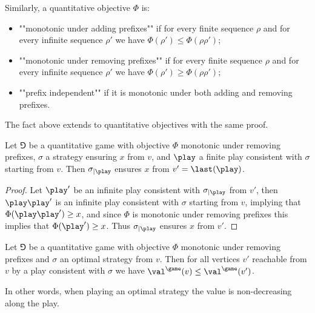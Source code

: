 Similarly, a quantitative objective $\Phi$ is:
\begin{itemize}
	\item ""monotonic under adding prefixes"" if for every finite sequence $\rho$ and for every infinite sequence $\rho'$
	we have $\Phi(\rho') \le \Phi(\rho \rho')$;
	\item ""monotonic under removing prefixes"" if for every finite sequence $\rho$ and for every infinite sequence $\rho'$
	we have $\Phi(\rho') \ge \Phi(\rho \rho')$;
	\item ""prefix independent"" if it is monotonic under both adding and removing prefixes.
\end{itemize}
The fact above extends to quantitative objectives with the same proof.
\begin{fact}
\label{1-fact:winning_prefix_independent_quantitative}
Let $\Game$ be a quantitative game with objective $\Phi$ monotonic under removing prefixes,
$\sigma$ a strategy ensuring $x$ from $v$, and $\play$ a finite play consistent with $\sigma$ starting from $v$.
Then $\sigma_{\mid \play}$ ensures $x$ from $v' = \last(\play)$.
\end{fact}
\begin{proof}
Let $\play'$ be an infinite play consistent with $\sigma_{\mid \play}$ from $v'$,
then $\play \play'$ is an infinite play consistent with $\sigma$ starting from $v$, 
implying that $\Phi(\play \play') \ge x$, and since $\Phi$ is monotonic under removing prefixes
this implies that $\Phi(\play') \ge x$. Thus $\sigma_{\mid \play}$ ensures $x$ from $v'$.
\end{proof}

\begin{corollary}
\label{1-cor:comparison_values_along_play}
Let $\Game$ be a quantitative game with objective $\Phi$ monotonic under removing prefixes and $\sigma$ an optimal strategy from $v$.
Then for all vertices $v'$ reachable from $v$ by a play consistent with $\sigma$ we have $\val^{\game}(v) \le \val^{\game}(v')$.
\end{corollary}
In other words, when playing an optimal strategy the value is non-decreasing along the play.
